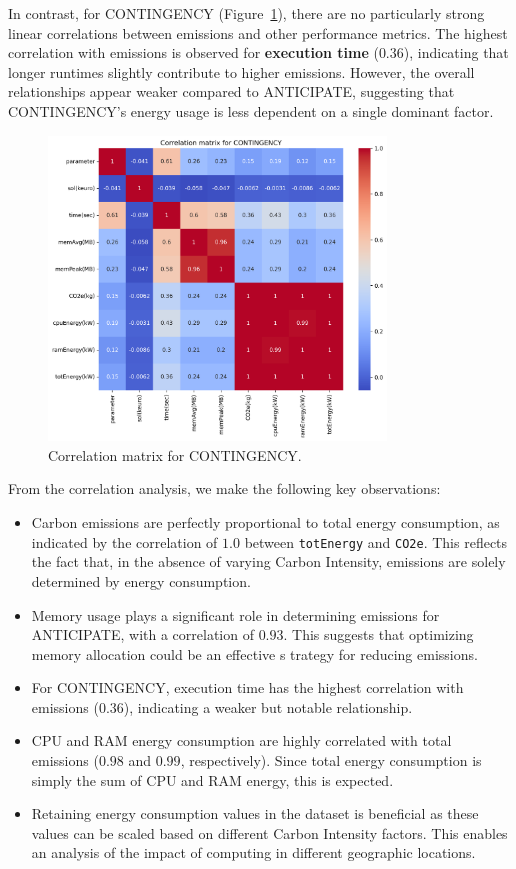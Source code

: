 \documentclass[a4paper,singleside,12pt]{report} %
\begin{document}
In contrast, for CONTINGENCY (Figure~\ref{fig:cont_corr_mat}), there are no particularly strong linear correlations between emissions and other performance metrics. The highest correlation with 
emissions is observed for \textbf{execution time} ($0.36$), indicating that longer runtimes slightly contribute to higher emissions. However, the overall relationships appear weaker compared 
to ANTICIPATE, suggesting that CONTINGENCY’s energy usage is less dependent on a single dominant factor.

\begin{figure}[h!]
    \centering
    \includegraphics[width=0.8\textwidth]{imgs/cont_corr_mat.png}
    \caption{Correlation matrix for CONTINGENCY.}
    \label{fig:cont_corr_mat}
\end{figure}

From the correlation analysis, we make the following key observations:
\begin{itemize}
    \item Carbon emissions are perfectly proportional to total energy consumption, as indicated by the correlation of $1.0$ between \verb|totEnergy| and \verb|CO2e|. This reflects the fact 
    that, in the absence of varying Carbon Intensity, emissions are solely determined by energy consumption.
    \item Memory usage plays a significant role in determining emissions for ANTICIPATE, with a correlation of $0.93$. This suggests that optimizing memory allocation could be an effective s
    trategy for reducing emissions.
    \item For CONTINGENCY, execution time has the highest correlation with emissions ($0.36$), indicating a weaker but notable relationship.
    \item CPU and RAM energy consumption are highly correlated with total emissions ($0.98$ and $0.99$, respectively). Since total energy consumption is simply the sum of CPU and RAM energy, 
    this is expected.
    \item Retaining energy consumption values in the dataset is beneficial as these values can be scaled based on different Carbon Intensity factors. This enables an analysis of the impact 
    of computing in different geographic locations.
\end{itemize}
\end{document}
